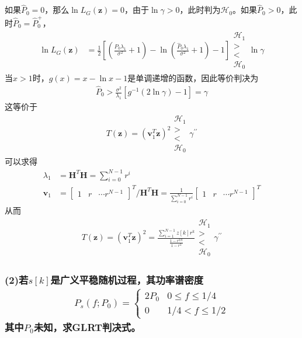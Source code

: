 \documentclass[fontset=windows]{article}
\numberwithin{figure}{section}
\begin{document}
如果\(\hat{P}_0=0\)，那么\(\ln L_G(\mathbf{z})=0\)，由于\(\ln\gamma>0\)，此时判为\(\mathcal{H}_0\)。如果\(\hat{P}_0>0\)，此时\(\hat{P}_0=\hat{P}_0^+\)，
\begin{align*}
	\ln L_G(\mathbf{z})
	 & =\frac{1}{2}\left[(\frac{\hat{P}_0\lambda_1}{\sigma^2}+1)-\ln(\frac{\hat{P}_0\lambda_1}{\sigma^2}+1)-1\right]
	\begin{matrix}
		\mathcal{H}_1 \\>\\<\\\mathcal{H}_0
	\end{matrix}\ln \gamma
\end{align*}
当\(x>1\)时，\(g(x)=x-\ln x-1\)是单调递增的函数，因此等价判决为
\begin{align*}
	\hat{P}_0>\frac{\sigma^2}{\lambda_1}[g^{-1}(2\ln \gamma)-1]=\gamma
\end{align*}
这等价于
\begin{align*}
	T(\mathbf{z})=(\mathbf{v}_1^T\mathbf{z})^2
	\begin{matrix}
		\mathcal{H}_1 \\>\\<\\\mathcal{H}_0
	\end{matrix}\gamma^{\prime\prime}
\end{align*}
可以求得
\begin{align*}
	\lambda_1
	 & =\mathbf{H}^T\mathbf{H}=\sum_{i=0}^{N-1}r^i \\
	\mathbf{v}_1
	 & =\begin{bmatrix}
		    1 & r & \cdots r^{N-1}
	    \end{bmatrix}^T/\mathbf{H}^T\mathbf{H}
	=\frac{1}{\sum_{i=0}^{N-1}r^i}
	\begin{bmatrix}
		1 & r & \cdots r^{N-1}
	\end{bmatrix}^T
\end{align*}
从而
\begin{align*}
	T(\mathbf{z})=(\mathbf{v}_1^T\mathbf{z})^2=\frac{\sum_{i=1}^{N-1}z[k]r^k}{\frac{1-r^{2N}}{1-r^2}}
	\begin{matrix}
		\mathcal{H}_1 \\>\\<\\\mathcal{H}_0
	\end{matrix} \gamma^{\prime\prime}
\end{align*}

\subsubsection*{(2)若\(s[k]\)是广义平稳随机过程，其功率谱密度
	\begin{align*}
		P_s(f;P_0)=\left\{
		\begin{matrix}
			2P_0 & 0\leqslant f\leqslant 1/4 \\
			0    & 1/4<f\leqslant1/2
		\end{matrix}\right.
	\end{align*}
	其中\(P_0\)未知，求GLRT判决式。}
\end{document}
